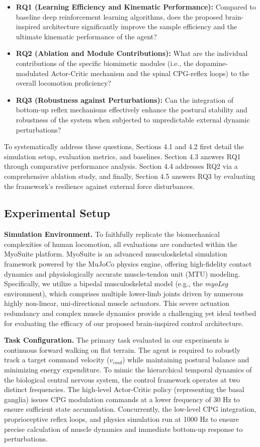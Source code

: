 \documentclass[lettersize,journal]{IEEEtran}
\begin{document}
\begin{itemize}
    \item \textbf{RQ1 (Learning Efficiency and Kinematic Performance):} Compared to baseline deep reinforcement learning algorithms, does the proposed brain-inspired architecture significantly improve the sample efficiency and the ultimate kinematic performance of the agent?
    \item \textbf{RQ2 (Ablation and Module Contributions):} What are the individual contributions of the specific biomimetic modules (i.e., the dopamine-modulated Actor-Critic mechanism and the spinal CPG-reflex loops) to the overall locomotion proficiency?
    \item \textbf{RQ3 (Robustness against Perturbations):} Can the integration of bottom-up reflex mechanisms effectively enhance the postural stability and robustness of the system when subjected to unpredictable external dynamic perturbations?
\end{itemize}

To systematically address these questions, Sections 4.1 and 4.2 first detail the simulation setup, evaluation metrics, and baselines. 
Section 4.3 answers RQ1 through comparative performance analysis. 
Section 4.4 addresses RQ2 via a comprehensive ablation study, and finally, Section 4.5 answers RQ3 by evaluating the framework's resilience against external force disturbances.


\subsection{Experimental Setup}

\textbf{Simulation Environment.} To faithfully replicate the biomechanical complexities of human locomotion, all evaluations are conducted within the MyoSuite platform. 
MyoSuite is an advanced musculoskeletal simulation framework powered by the MuJoCo physics engine, offering high-fidelity contact dynamics and physiologically accurate muscle-tendon unit (MTU) modeling. 
Specifically, we utilize a bipedal musculoskeletal model (e.g., the \textit{myoLeg} environment), which comprises multiple lower-limb joints driven by numerous highly non-linear, uni-directional muscle actuators. 
This severe actuation redundancy and complex muscle dynamics provide a challenging yet ideal testbed for evaluating the efficacy of our proposed brain-inspired control architecture.

\textbf{Task Configuration.} The primary task evaluated in our experiments is continuous forward walking on flat terrain. 
The agent is required to robustly track a target command velocity ($v_{cmd}$) while maintaining postural balance and minimizing energy expenditure. 
To mimic the hierarchical temporal dynamics of the biological central nervous system, the control framework operates at two distinct frequencies. 
The high-level Actor-Critic policy (representing the basal ganglia) issues CPG modulation commands at a lower frequency of 30 Hz to ensure sufficient state accumulation. 
Concurrently, the low-level CPG integration, proprioceptive reflex loops, and physics simulation run at 1000 Hz to ensure precise calculation of muscle dynamics and immediate bottom-up response to perturbations.
\end{document}
